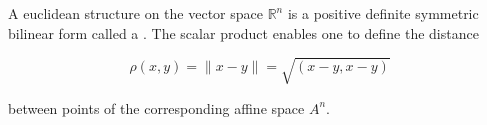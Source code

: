 A euclidean structure on the vector space $\mathbb{R}^n$ is a positive definite symmetric bilinear form called a . The scalar product enables one to define the distance

$$\rho(x, y) = \|x - y\| = \sqrt{(x - y, x - y)}$$

between points of the corresponding affine space $A^n$.
